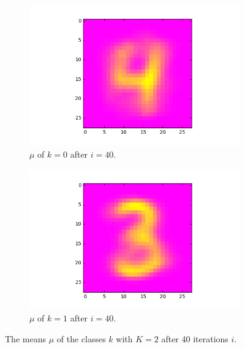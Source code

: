\documentclass[a4paper,10pt]{article}
\numberwithin{equation}{section} %
\numberwithin{figure}{section} %
\numberwithin{table}{section} %
\theoremstyle{mytheor}
\begin{document}
\begin{enumerate}
		\begin{figure}[h]
			\centering
			\begin{subfigure}[b]{0.24\textwidth}
				\includegraphics[width=\textwidth]{digits/39_k2_class0.png}\vspace{-0.4cm}
				\caption{$\mu$ of $k=0$ after $i=40$.}
			\end{subfigure}
			\begin{subfigure}[b]{0.24\textwidth}
				\includegraphics[width=\textwidth]{digits/39_k2_class1.png}\vspace{-0.4cm}
				\caption{$\mu$ of $k=1$ after $i=40$.}
			\end{subfigure}
   			\caption{\vspace{-0.1cm} The means $\mu$ of the classes $k$ with $K = 2$ after 40 iterations $i$.}\vspace{-0.2cm}
  		\end{figure}


\end{enumerate}
\end{document}
